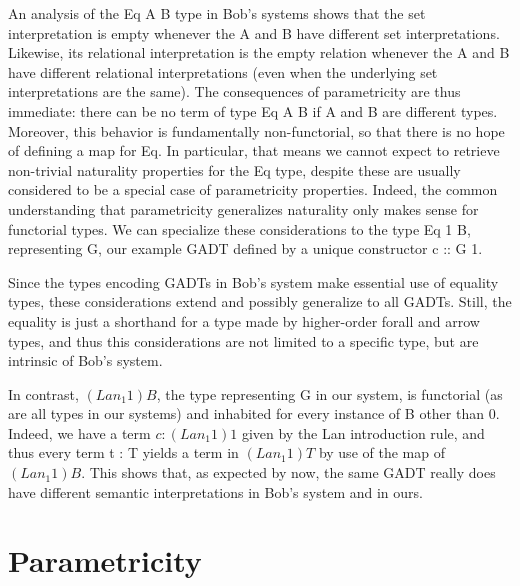 \documentclass[acmsmall,screen,review,anonymous]{acmart}
\theoremstyle{definition}
\begin{document}
An analysis of the Eq A B type in Bob's systems shows that the set
interpretation is empty whenever the A and B have different set
interpretations.  Likewise, its relational interpretation is the empty
relation whenever the A and B have different relational
interpretations (even when the underlying set interpretations are the
same).  The consequences of parametricity are thus immediate: there
can be no term of type Eq A B if A and B are different types.
Moreover, this behavior is fundamentally non-functorial, so that there
is no hope of defining a map for Eq.  In particular, that means we
cannot expect to retrieve non-trivial naturality properties for the Eq
type, despite these are usually considered to be a special case of
parametricity properties.  Indeed, the common understanding that
parametricity generalizes naturality only makes sense for functorial
types.  We can specialize these considerations to the type Eq 1 B,
representing G, our example GADT defined by a unique constructor c ::
G 1.

Since the types encoding GADTs in Bob's system make essential use
of equality types, these considerations extend and possibly generalize
to all GADTs.  Still, the equality is just a shorthand for a type made
by higher-order forall and arrow types, and thus this considerations
are not limited to a specific type, but are intrinsic of Bob's
system.

In contrast, $(Lan_1 1) B$, the type representing G in our system, is
functorial (as are all types in our systems) and inhabited for every
instance of B other than 0.  Indeed, we have a term $c : (Lan_1 1) 1$
given by the Lan introduction rule, and thus every term t : T yields a
term in $(Lan_1 1) T$ by use of the map of $(Lan_1 1) B$.  This shows
that, as expected by now, the same GADT really does have different
semantic interpretations in Bob's system and in ours.

\section{Parametricity}
\end{document}

